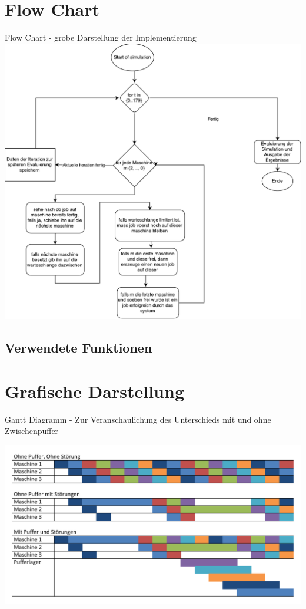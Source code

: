 \section{Flow Chart}
\begin{frame}{Flow Chart - grobe Darstellung der Implementierung}
	\centering
  	\includegraphics[scale=0.3]{BSP23_Flow_Chart.pdf}
\end{frame}

\subsection{Verwendete Funktionen}


\section{Grafische Darstellung}
\begin{frame}[fragile]{Gantt Diagramm - Zur Veranschaulichung des Unterschieds mit und ohne Zwischenpuffer}
\begin{center}
	\vspace{-.8cm}
  	\includegraphics[scale=.6]{BSP23_Gantt.pdf}
\end{center}
\end{frame}


